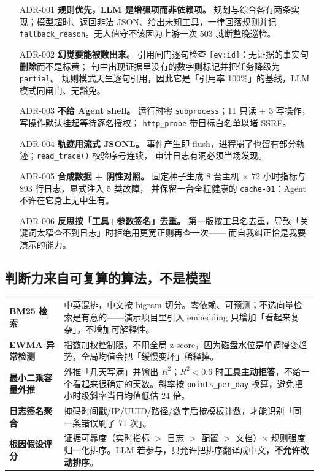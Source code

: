 \documentclass[10.5pt,a4paper]{article}
\newcommand{\yadi}{\CJKfamily{yahei}}
\newcommand{\Nread}{11}
\newcommand{\Nwrite}{3}
\begin{document}
\begin{itemize}
\item[\textcolor{accent}{\yadi ADR-001}] \textbf{规则优先，LLM 是增强项而非依赖项。}
  规划与综合各有两条实现；模型超时、返回非法 JSON、给出未知工具，一律回落规则并记
  \texttt{fallback\_reason}。无人值守不该因为上游一次 503 就断整晚巡检。
\item[\textcolor{accent}{\yadi ADR-002}] \textbf{幻觉要能被数出来。}
  引用闸门逐句检查 \texttt{[ev:id]}：无证据的事实句\textbf{删除}而不是标黄；
  句中出现证据里没有的数字则标记并把任务降级为 \texttt{partial}。
  规则模式天生逐句引用，因此它是「引用率 100\%」的基线，LLM 模式同闸门、无豁免。
\item[\textcolor{accent}{\yadi ADR-003}] \textbf{不给 Agent shell。}
  运行时零 \texttt{subprocess}；\Nread{} 只读 + \Nwrite{} 写操作，写操作默认挂起等待逐名授权；
  \texttt{http\_probe} 带目标白名单以堵 SSRF。
\item[\textcolor{accent}{\yadi ADR-004}] \textbf{轨迹用流式 JSONL。}
  事件产生即 flush，进程崩了也留有部分轨迹；\texttt{read\_trace()} 校验序号连续，
  审计日志有洞必须当场发现。
\item[\textcolor{accent}{\yadi ADR-005}] \textbf{合成数据 + 阴性对照。}
  固定种子生成 8 台主机 × 72 小时指标与 893 行日志，显式注入 5 类故障，
  并保留一台全程健康的 \texttt{cache-01}：Agent 不许在它身上无中生有。
\item[\textcolor{accent}{\yadi ADR-006}] \textbf{反思按「工具+参数签名」去重。}
  第一版按工具名去重，导致「关键词太窄查不到日志」时拒绝用更宽正则再查一次——
  而自我纠正恰是我要演示的能力。
\end{itemize}

\subsection{判断力来自可复算的算法，不是模型}

\begin{tabularx}{\textwidth}{@{}L{3.0cm}X@{}}
\textbf{BM25 检索} & 中英混排，中文按 bigram 切分。零依赖、可预测；不选向量检索是有意的——演示项目里引入 embedding 只增加「看起来复杂」，不增加可解释性。\\
\textbf{EWMA 异常检测} & 指数加权控制限。不用全局 z-score，因为磁盘水位是单调慢变趋势，全局均值会把「缓慢变坏」稀释掉。\\
\textbf{最小二乘容量外推} & 外推「几天写满」并输出 $R^2$；$R^2<0.6$ 时\textbf{工具主动拒答}，不给一个看起来很确定的天数。斜率按 \texttt{points\_per\_day} 换算，避免把小时级斜率当日均值低估 24 倍。\\
\textbf{日志签名聚合} & 掩码时间戳/IP/UUID/路径/数字后按模板计数，才能识别「同一条错误刷了 71 次」。\\
\textbf{根因假设评分} & 证据可靠度（实时指标 $>$ 日志 $>$ 配置 $>$ 文档）× 规则强度归一化排序。LLM 若参与，只允许把排序翻译成中文，\textbf{不允许改动排序}。\\
\end{tabularx}
\end{document}
